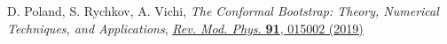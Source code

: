 \documentclass[a4paper,11pt]{article}
\begin{document}
\begin{thebibliography}{99}
 D. Poland, S. Rychkov, A. Vichi, \emph{The Conformal Bootstrap: Theory, Numerical Techniques, and Applications},
\href{https://doi.org/10.1103/RevModPhys.91.015002}{\emph{Rev. Mod. Phys.} {\bf 91}, 015002 (2019)}




\end{thebibliography}
\end{document}
